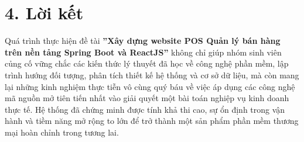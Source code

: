 \section*{4. Lời kết}
Quá trình thực hiện đề tài \textbf{''Xây dựng website POS Quản lý bán hàng trên nền tảng Spring Boot và ReactJS''} không chỉ giúp nhóm sinh viên củng cố vững chắc các kiến thức lý thuyết đã học về công nghệ phần mềm, lập trình hướng đối tượng, phân tích thiết kế hệ thống và cơ sở dữ liệu, mà còn mang lại những kinh nghiệm thực tiễn vô cùng quý báu về việc áp dụng các công nghệ mã nguồn mở tiên tiến nhất vào giải quyết một bài toán nghiệp vụ kinh doanh thực tế. Hệ thống đã chứng minh được tính khả thi cao, sự ổn định trong vận hành và tiềm năng mở rộng to lớn để trở thành một sản phẩm phần mềm thương mại hoàn chỉnh trong tương lai.
